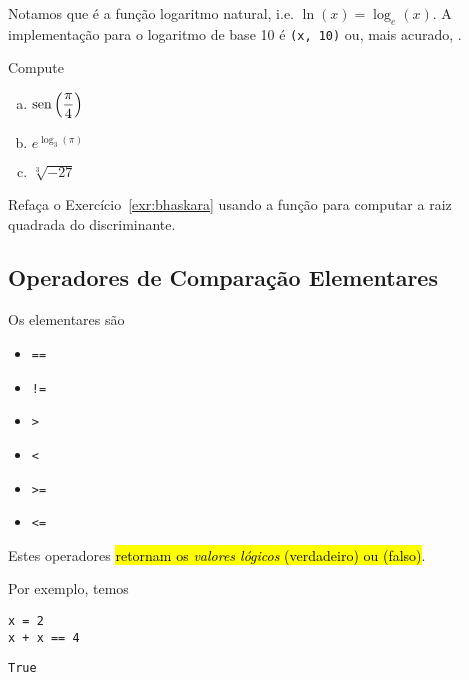 \documentclass[a4paper,10pt,twoside]{article}
\begin{document}
\begin{obs}
  Notamos que {\PYTHONmathDOTlog} é a função logaritmo natural, i.e. $\ln(x) = \log_e(x)$. A implementação {\python} para o logaritmo de base 10 é {\PYTHONmathDOTlog}\texttt{(x, 10)} ou, mais acurado, {\PYTHONmathDOTlogTen}.
\end{obs}

\begin{exr}
  Compute
  \begin{enumerate}[a)]
  \item $\displaystyle \operatorname{sen}\left(\frac{\pi}{4}\right)$
  \item $\displaystyle e^{\log_3(\pi)}$
  \item $\displaystyle \sqrt[3]{-27}$
  \end{enumerate}
\end{exr}

\begin{exr}
  Refaça o Exercício~\ref{exr:bhaskara} usando a função {\PYTHONmathDOTsqrt} para computar a raiz quadrada do discriminante.
\end{exr}

\subsection{Operadores de Comparação Elementares}

Os  elementares são
\begin{itemize}
\item[]\texttt{==} 
\item[]\texttt{!=} 
\item[]\texttt{>} 
\item[]\texttt{<} 
\item[]\texttt{>=} 
\item[]\texttt{<=} 
\end{itemize}
Estes operadores \hl{retornam os \emph{valores lógicos} {\PYTHONTrue} (verdadeiro) ou {\PYTHONFalse} (falso)}.

Por exemplo, temos

\begin{lstlisting}
x = 2
x + x == 4
\end{lstlisting}

\begin{verbatim}
True
\end{verbatim}
\end{document}

